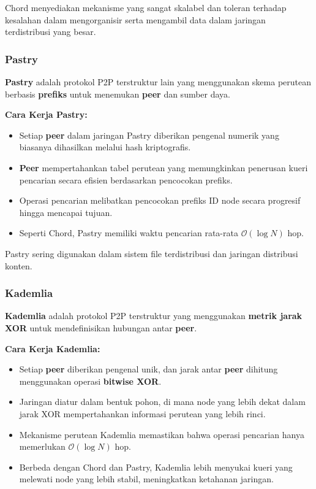 Chord menyediakan mekanisme yang sangat skalabel dan toleran terhadap kesalahan dalam mengorganisir serta mengambil data dalam jaringan terdistribusi yang besar.

\subsubsection{Pastry}
\textbf{Pastry} adalah protokol P2P terstruktur lain yang menggunakan skema perutean berbasis \textbf{prefiks} untuk menemukan \textbf{peer} dan sumber daya.

\textbf{Cara Kerja Pastry:}
\begin{itemize}
	\item Setiap \textbf{peer} dalam jaringan Pastry diberikan pengenal numerik yang biasanya dihasilkan melalui hash kriptografis.
	\item \textbf{Peer} mempertahankan tabel perutean yang memungkinkan penerusan kueri pencarian secara efisien berdasarkan pencocokan prefiks.
	\item Operasi pencarian melibatkan pencocokan prefiks ID node secara progresif hingga mencapai tujuan.
	\item Seperti Chord, Pastry memiliki waktu pencarian rata-rata \textbf{\(\mathcal{O}(\log N)\)} hop.
\end{itemize}

Pastry sering digunakan dalam sistem file terdistribusi dan jaringan distribusi konten.

\subsubsection{Kademlia}
\textbf{Kademlia} adalah protokol P2P terstruktur yang menggunakan \textbf{metrik jarak XOR} untuk mendefinisikan hubungan antar \textbf{peer}.

\textbf{Cara Kerja Kademlia:}
\begin{itemize}
	\item Setiap \textbf{peer} diberikan pengenal unik, dan jarak antar \textbf{peer} dihitung menggunakan operasi \textbf{bitwise XOR}.
	\item Jaringan diatur dalam bentuk pohon, di mana node yang lebih dekat dalam jarak XOR mempertahankan informasi perutean yang lebih rinci.
	\item Mekanisme perutean Kademlia memastikan bahwa operasi pencarian hanya memerlukan \textbf{\(\mathcal{O}(\log N)\)} hop.
	\item Berbeda dengan Chord dan Pastry, Kademlia lebih menyukai kueri yang melewati node yang lebih stabil, meningkatkan ketahanan jaringan.
\end{itemize}

